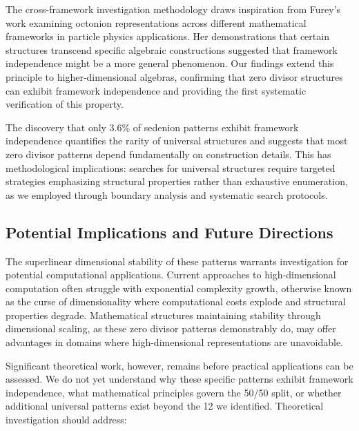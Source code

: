 \documentclass[11pt]{article}
\begin{document}
The cross-framework investigation methodology draws inspiration from Furey's work examining octonion representations across different mathematical frameworks in particle physics applications. Her demonstrations that certain structures transcend specific algebraic constructions suggested that framework independence might be a more general phenomenon. Our findings extend this principle to higher-dimensional algebras, confirming that zero divisor structures can exhibit framework independence and providing the first systematic verification of this property.

The discovery that only 3.6\% of sedenion patterns exhibit framework independence quantifies the rarity of universal structures and suggests that most zero divisor patterns depend fundamentally on construction details. This has methodological implications: searches for universal structures require targeted strategies emphasizing structural properties rather than exhaustive enumeration, as we employed through boundary analysis and systematic search protocols.

\subsection{Potential Implications and Future Directions}

The superlinear dimensional stability of these patterns warrants investigation for potential computational applications. Current approaches to high-dimensional computation often struggle with exponential complexity growth, otherwise known as the curse of dimensionality where computational costs explode and structural properties degrade. Mathematical structures maintaining stability through dimensional scaling, as these zero divisor patterns demonstrably do, may offer advantages in domains where high-dimensional representations are unavoidable.

Significant theoretical work, however, remains before practical applications can be assessed. We do not yet understand why these specific patterns exhibit framework independence, what mathematical principles govern the 50/50 split, or whether additional universal patterns exist beyond the 12 we identified. Theoretical investigation should address:
\end{document}
